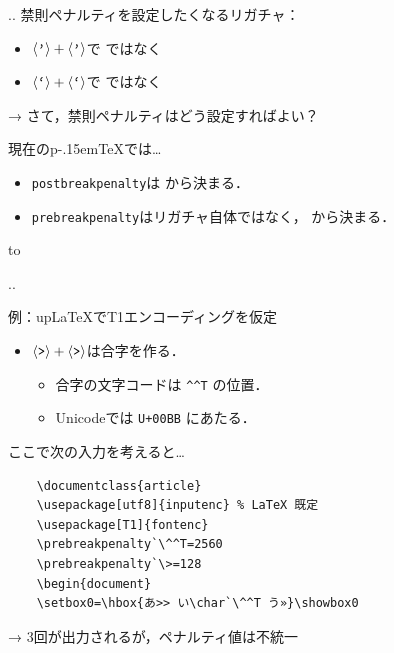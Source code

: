 \documentclass[a5paper,dvipdfmx,14pt]{beamer}
\def\cs#1{\texttt{\char92\nobreak#1}}
\def\pTeX{p\kern-.15em\TeX}
\def\pLaTeX{p\LaTeX}
\def\upLaTeX{u\pLaTeX}
\begin{document}
\begin{frame}[t,fragile]{\insertsectionnumber.\insertsubsectionnumber. \insertsubsection}
禁則ペナルティを設定したくなるリガチャ：
\begin{itemize}\small
  \item $\langle\mbox{\texttt{'}}\rangle+\langle\mbox{\texttt{'}}\rangle$\hspace{7pt}で\hspace{4pt}
     ではなく 
  \item $\langle\mbox{\texttt{`}}\rangle+\langle\mbox{\texttt{`}}\rangle$\hspace{7pt}で\hspace{4pt}
     ではなく 
\end{itemize}
\medskip
→ さて，禁則ペナルティはどう設定すればよい？\par\medskip
\pause
現在の\pTeX では…
\begin{tcolorbox}[colframe=black!70!blue,colback=white!90!blue]\small
\begin{itemize}\small\leftskip-18pt
  \item \cs{postbreakpenalty}は
    から決まる．
  \item \cs{prebreakpenalty}はリガチャ自体ではなく，
    から決まる．
\end{itemize}
\end{tcolorbox}
\pause
\leavevmode\hbox to
\end{frame}

\begin{frame}[t,fragile]{\insertsectionnumber.\insertsubsectionnumber. \insertsubsection}{}
{\small\def\verbnotesize{\scriptsize}
例：\upLaTeX でT1エンコーディングを仮定
\begin{itemize}
  \item $\langle\mbox{\texttt{>}}\rangle+\langle\mbox{\texttt{>}}\rangle$は合字を作る．
    \begin{itemize}
      \item 合字の文字コードは \verb|^^T| の位置．
      \item Unicodeでは \verb|U+00BB| にあたる．
    \end{itemize}
\end{itemize}
}
{\small ここで次の入力を考えると…}
{\footnotesize
\begin{verbatim}
    \documentclass{article}
    \usepackage[utf8]{inputenc} % LaTeX 既定
    \usepackage[T1]{fontenc}
    \prebreakpenalty`\^^T=2560
    \prebreakpenalty`\>=128
    \begin{document}
    \setbox0=\hbox{あ>> い\char`\^^T う»}\showbox0
\end{verbatim}
}
{\small → 3回が出力されるが，ペナルティ値は不統一\SUSHI}
\end{frame}
\end{document}
